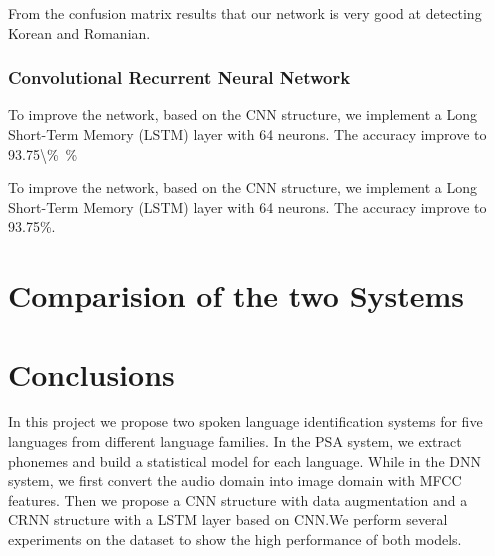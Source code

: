 \documentclass{article}
\begin{document}
From the confusion matrix results that our network is very good at detecting Korean and Romanian.

\subsubsection{Convolutional Recurrent Neural Network}
To improve the network, based on the CNN structure, we implement a Long Short-Term Memory (LSTM) layer with 64 neurons. The accuracy improve to \SI{93.75\%}{\percent}

To improve the network, based on the CNN structure, we implement a Long Short-Term Memory (LSTM) layer with 64 neurons. 
The accuracy improve to 93.75\%.

\section{Comparision of the two Systems}
\label{sec:comparision}


\section{Conclusions}
\label{sec:conclusion}

In this project we propose two spoken language identification systems for five languages from different language families. In the PSA system, we extract phonemes and build a statistical model for each language. While in the DNN system, we first convert the audio domain into image domain with MFCC features. Then we propose a CNN structure with data augmentation and a CRNN structure with a LSTM layer based on CNN.We perform several experiments on the dataset to show the high performance of both models.
 




\end{document}
